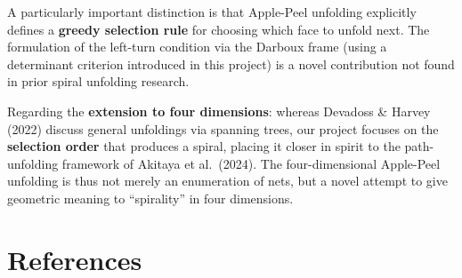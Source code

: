 \documentclass[a4paper,11pt]{article}
\begin{document}
A particularly important distinction is that Apple-Peel unfolding explicitly defines a
\textbf{greedy selection rule} for choosing which face to unfold next.
The formulation of the left-turn condition via the Darboux frame
(using a determinant criterion introduced in this project) is a novel contribution
not found in prior spiral unfolding research.

Regarding the \textbf{extension to four dimensions}: whereas Devadoss \& Harvey (2022) discuss
general unfoldings via spanning trees, our project focuses on the \textbf{selection order}
that produces a spiral, placing it closer in spirit to the path-unfolding framework
of Akitaya et al.\ (2024).
The four-dimensional Apple-Peel unfolding is thus not merely an enumeration of nets,
but a novel attempt to give geometric meaning to ``spirality'' in four dimensions.

\section*{References}
\end{document}
